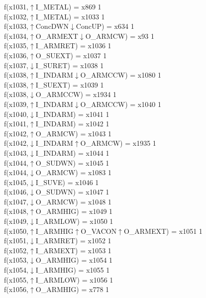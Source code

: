 f(x1031,$\uparrow$I\_METAL) = x869 {1} \\
f(x1032,$\uparrow$I\_METAL) = x1033 {1} \\
f(x1033,$\uparrow$ConcDWN$\downarrow$ConcUP) = x634 {1} \\
f(x1034,$\uparrow$O\_ARMEXT$\downarrow$O\_ARMCW) = x93 {1} \\
f(x1035,$\uparrow$I\_ARMRET) = x1036 {1} \\
f(x1036,$\uparrow$O\_SUEXT) = x1037 {1} \\
f(x1037,$\downarrow$I\_SURET) = x1038 {1} \\
f(x1038,$\uparrow$I\_INDARM$\downarrow$O\_ARMCCW) = x1080 {1} \\
f(x1038,$\uparrow$I\_SUEXT) = x1039 {1} \\
f(x1038,$\downarrow$O\_ARMCCW) = x1934 {1} \\
f(x1039,$\uparrow$I\_INDARM$\downarrow$O\_ARMCCW) = x1040 {1} \\
f(x1040,$\downarrow$I\_INDARM) = x1041 {1} \\
f(x1041,$\uparrow$I\_INDARM) = x1042 {1} \\
f(x1042,$\uparrow$O\_ARMCW) = x1043 {1} \\
f(x1042,$\downarrow$I\_INDARM$\uparrow$O\_ARMCW) = x1935 {1} \\
f(x1043,$\downarrow$I\_INDARM) = x1044 {1} \\
f(x1044,$\uparrow$O\_SUDWN) = x1045 {1} \\
f(x1044,$\downarrow$O\_ARMCW) = x1083 {1} \\
f(x1045,$\downarrow$I\_SUVE) = x1046 {1} \\
f(x1046,$\downarrow$O\_SUDWN) = x1047 {1} \\
f(x1047,$\downarrow$O\_ARMCW) = x1048 {1} \\
f(x1048,$\uparrow$O\_ARMHIG) = x1049 {1} \\
f(x1049,$\downarrow$I\_ARMLOW) = x1050 {1} \\
f(x1050,$\uparrow$I\_ARMHIG$\uparrow$O\_VACON$\uparrow$O\_ARMEXT) = x1051 {1} \\
f(x1051,$\downarrow$I\_ARMRET) = x1052 {1} \\
f(x1052,$\uparrow$I\_ARMEXT) = x1053 {1} \\
f(x1053,$\downarrow$O\_ARMHIG) = x1054 {1} \\
f(x1054,$\downarrow$I\_ARMHIG) = x1055 {1} \\
f(x1055,$\uparrow$I\_ARMLOW) = x1056 {1} \\
f(x1056,$\uparrow$O\_ARMHIG) = x778 {1} \\
